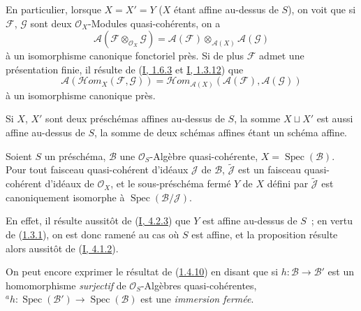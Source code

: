 \begin{env}[1.4.8]
\label{II.1.4.8-fr}
En particulier, lorsque $X=X'=Y$ ($X$ étant affine au-dessus de $S$), on voit
que si $\mathcal{F}$, $\mathcal{G}$ sont deux $\mathcal{O}_X$-Modules
quasi-cohérents, on a
\[
  \mathcal{A}(\mathcal{F}\otimes_{\mathcal{O}_X}\mathcal{G})
  =\mathcal{A}(\mathcal{F})\otimes_{\mathcal{A}(X)}\mathcal{A}(\mathcal{G})
  \tag{1.4.8.1}\label{II.1.4.8.1-fr}
\]
à un isomorphisme canonique fonctoriel près. Si de plus $\mathcal{F}$ admet
une présentation finie, il résulte de
(\hyperref[I.1.6.3-fr]{I, 1.6.3} et
\hyperref[I.1.3.12-fr]{I, 1.3.12}) que
\[
  \mathcal{A}(\mathcal{H}om_X(\mathcal{F},\mathcal{G}))
  =\mathcal{H}om_{\mathcal{A}(X)}
    (\mathcal{A}(\mathcal{F}),\mathcal{A}(\mathcal{G}))
  \tag{1.4.8.2}\label{II.1.4.8.2-fr}
\]
à un isomorphisme canonique près.
\end{env}

\begin{remark}[1.4.9]
\label{II.1.4.9-fr}
Si $X$, $X'$ sont deux préschémas affines au-dessus de $S$, la somme
$X\sqcup X'$ est aussi affine au-dessus de $S$, la somme de deux schémas
affines étant un schéma affine.
\end{remark}

\begin{proposition}[1.4.10]
\label{II.1.4.10-fr}
Soient $S$ un préschéma, $\mathcal{B}$ une $\mathcal{O}_S$-Algèbre
quasi-cohérente, $X=\operatorname{Spec}(\mathcal{B})$. Pour tout faisceau
quasi-cohérent d'idéaux $\mathcal{J}$ de $\mathcal{B}$,
$\widetilde{\mathcal{J}}$ est un faisceau quasi-cohérent d'idéaux de
$\mathcal{O}_X$, et le sous-préschéma fermé $Y$ de $X$ défini par
$\widetilde{\mathcal{J}}$ est canoniquement isomorphe à
$\operatorname{Spec}(\mathcal{B}/\mathcal{J})$.
\end{proposition}

En effet, il résulte aussitôt de (\hyperref[I.4.2.3-fr]{I, 4.2.3}) que $Y$
est affine au-dessus de $S$~; en vertu de
(\hyperref[II.1.3.1-fr]{1.3.1}), on est donc ramené au cas où $S$ est affine,
et la proposition résulte alors aussitôt de
(\hyperref[I.4.1.2-fr]{I, 4.1.2}).

On peut encore exprimer le résultat de
(\hyperref[II.1.4.10-fr]{1.4.10}) en disant que si
$h:\mathcal{B}\to\mathcal{B}'$ est un homomorphisme \emph{surjectif} de
$\mathcal{O}_S$-Algèbres quasi-cohérentes,
${}^a h:\operatorname{Spec}(\mathcal{B}')\to
\operatorname{Spec}(\mathcal{B})$ est une \emph{immersion fermée}.

